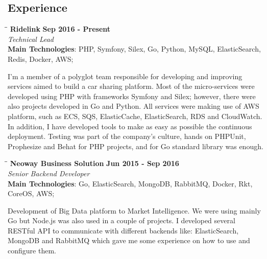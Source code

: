 \documentclass[margin]{res}
\begin{document}
\begin{resume}
\section{Experience}
\vspace{-0.1in}
    \begin{tabbing}
    \hspace{2.3in}\= \hspace{1.7in}\= \kill %
    \textbf{Ridelink}    \>\>\textbf{Sep 2016 - Present}\\
    \textit{Technical Lead}\\
    \textbf{Main Technologies}: PHP, Symfony, Silex, Go, Python, MySQL, ElasticSearch, \\Redis, Docker, AWS;
    \end{tabbing}\vspace{-20pt}      %
    \vspace{2mm}
I'm a member of a polyglot team responsible for developing and improving services aimed to build a car sharing platform. Most of the micro-services were developed using PHP with frameworks Symfony and Silex; however, there were also projects developed in Go and Python. All services were making use of AWS platform, such as ECS, SQS, ElasticCache, ElasticSearch, RDS and CloudWatch. In addition, I have developed tools to make as easy as possible the continuous deployment. Testing was part of the company’s culture, hands on PHPUnit, Prophesize and Behat for PHP projects, and for Go standard library was enough.

\vspace{-0.1in}
    \begin{tabbing}
    \hspace{2.3in}\= \hspace{1.7in}\= \kill %
    \textbf{Neoway Business Solution}    \>\>\textbf{Jun 2015 - Sep 2016}\\
    \textit{Senior Backend Developer}\\
    \textbf{Main Technologies}: Go, ElasticSearch, MongoDB, RabbitMQ, Docker, Rkt,\\CoreOS, AWS;
    \end{tabbing}\vspace{-20pt}      %
    \vspace{2mm}
Development of Big Data platform to Market Intelligence. We were using mainly Go but Node.js was also used in a couple of projects. I developed several RESTful API to communicate with different backends like: ElasticSearch, MongoDB and RabbitMQ which gave me some experience on how to use and configure them.


\end{resume}
\end{document}
